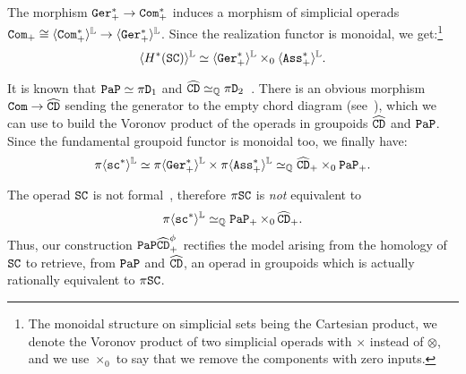 The morphism $\mathtt{Ger}_{+}^{*} \to \mathtt{Com}_{+}^{*}$ induces a morphism of simplicial operads $\mathtt{Com}_{+} \cong \langle \mathtt{Com}_{+}^{*} \rangle^{\mathbb{L}} \to \langle \mathtt{Ger}_{+}^{*} \rangle^{\mathbb{L}}$.
Since the realization functor is monoidal, we get:\footnote{The monoidal structure on simplicial sets being the Cartesian product, we denote the Voronov product of two simplicial operads with $\times$ instead of $\otimes$, and we use $\times_{0}$ to say that we remove the components with zero inputs.}
\[ \langle H^{*}(\mathtt{SC}) \rangle^{\mathbb{L}} \simeq \langle \mathtt{Ger}_{+}^{*} \rangle^{\mathbb{L}} \times_{0} \langle \mathtt{Ass}_{+}^{*} \rangle^{\mathbb{L}}. \]

It is known that $\mathtt{PaP} \simeq \pi \mathtt{D}_{1}$ and $\widehat{\mathtt{CD}} \simeq_{\mathbb{Q}} \pi \mathtt{D}_{2}$~\cite[§5,§10]{Fresse2017}.
There is an obvious morphism $\mathtt{Com} \to \widehat{\mathtt{CD}}$ sending the generator to the empty chord diagram (see~\cite{FresseWillwacher2015}), which we can use to build the Voronov product of the operads in groupoids $\widehat{\mathtt{CD}}$ and $\mathtt{PaP}$.
Since the fundamental groupoid functor is monoidal too, we finally have:
\[ \pi\langle \mathtt{sc}^{*} \rangle^{\mathbb{L}} \simeq \pi\langle \mathtt{Ger}_{+}^{*} \rangle^{\mathbb{L}} \times \pi\langle \mathtt{Ass}_{+}^{*} \rangle^{\mathbb{L}} \simeq_{\mathbb{Q}} \widehat{\mathtt{CD}}_{+} \times_{0} \mathtt{PaP}_{+}. \]

The operad $\mathtt{SC}$ is not formal~\cite{Livernet2015}, therefore $\pi \mathtt{SC}$ is \emph{not} equivalent to
\[ \pi\langle \mathtt{sc}^{*} \rangle^{\mathbb{L}} \simeq_{\mathbb{Q}} \mathtt{PaP}_{+} \mathop{\times_{0}} \widehat{\mathtt{CD}}_{+}. \]
Thus, our construction $\mathtt{PaP}\widehat{\mathtt{CD}}_{+}^{\phi}$ rectifies the model arising from the homology of $\mathtt{SC}$ to retrieve, from $\mathtt{PaP}$ and $\widehat{\mathtt{CD}}$, an operad in groupoids which is actually rationally equivalent to $\pi \mathtt{SC}$.
